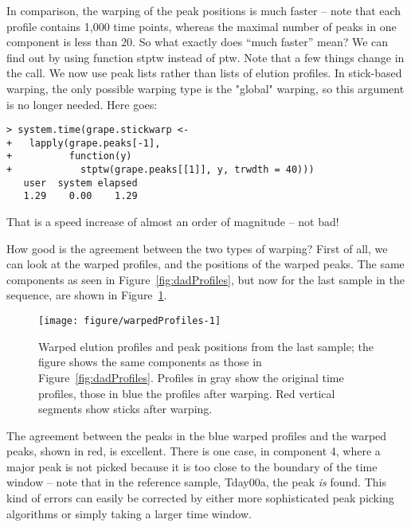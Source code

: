 \documentclass[a4paper,11pt]{article}\usepackage[]{graphicx}\usepackage[]{color}
\makeatletter
\newenvironment{kframe}{%
 \def\at@end@of@kframe{}%
 \ifinner\ifhmode%
  \def\at@end@of@kframe{\end{minipage}}%
  \begin{minipage}{\columnwidth}%
 \fi\fi%
 \def\FrameCommand##1{\hskip\@totalleftmargin \hskip-\fboxsep
 \colorbox{shadecolor}{##1}\hskip-\fboxsep
     \hskip-\linewidth \hskip-\@totalleftmargin \hskip\columnwidth}%
 \MakeFramed {\advance\hsize-\width
   \@totalleftmargin\z@ \linewidth\hsize
   \@setminipage}}%
 {\par\unskip\endMakeFramed%
 \at@end@of@kframe}
\newenvironment{knitrout}{}{} %
\newcommand{\code}[1]{{\ttfamily #1}}
\makeatother
\begin{document}
\noindent
In comparison, the warping of the peak positions is much faster --
note that each profile contains 1,000 time points, whereas the maximal
number of peaks in one component is less than 20. So what exactly does
``much faster'' mean? We can find out by using function \code{stptw}
instead of \code{ptw}. Note that a few things change in the
call. We now use peak lists rather than lists of elution
profiles. In stick-based warping, the only possible warping type is
the \code{"global"} warping, so this argument is no longer
needed. Here goes: 

\begin{knitrout}\small
{}\color{fgcolor}\begin{kframe}
\begin{verbatim}
> system.time(grape.stickwarp <- 
+   lapply(grape.peaks[-1], 
+          function(y) 
+            stptw(grape.peaks[[1]], y, trwdth = 40)))
   user  system elapsed 
   1.29    0.00    1.29 
\end{verbatim}
\end{kframe}
\end{knitrout}

\noindent
That is a speed increase of almost an order of magnitude -- not bad!

How good is the agreement between the two types of warping? First of
all, we can look at the warped profiles, and the positions of the
warped peaks. The same components as seen in
Figure~\ref{fig:dadProfiles}, but now for the last sample in the
sequence, are shown in Figure~\ref{fig:warpedProfiles}.

\begin{figure}[tb]
\centering
\begin{knitrout}\small
{}\color{fgcolor}
\texttt{[image: figure/warpedProfiles-1]} 
\end{knitrout}
\caption{Warped elution profiles and peak positions from the last
  sample; the figure shows the same components as those in
  Figure~\protect\ref{fig:dadProfiles}. Profiles in gray show the
  original time profiles, those in blue the profiles after
  warping. Red vertical segments show sticks after warping.}
\label{fig:warpedProfiles}
\end{figure}

The agreement between the peaks in the blue warped profiles and the
warped peaks, shown in red, is excellent. There is one case, in
component 4, where a major peak is not picked because it is too close
to the boundary of the time window -- note that in the reference
sample, Tday00a, the peak \emph{is} found. This kind of errors can
easily be corrected by either more sophisticated peak picking
algorithms or simply taking a larger time window.
\end{document}

